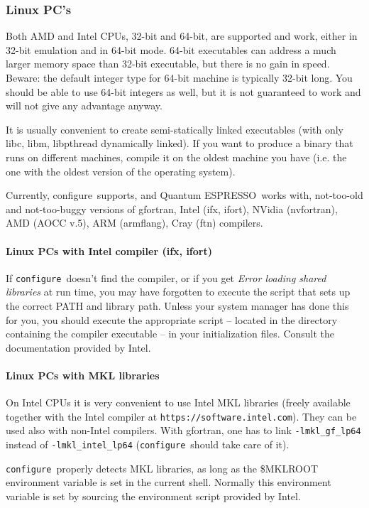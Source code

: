 \documentclass[12pt,a4paper]{article}
\def\qe{{\sc Quantum ESPRESSO}}
\def\configure{\texttt{configure}}
\begin{document}
\subsubsection{Linux PC's}

Both AMD and Intel CPUs, 32-bit and 64-bit, are supported and work,
either in 32-bit emulation and in 64-bit mode. 64-bit executables
can address a much larger memory space than 32-bit executable, but
there is no gain in speed.
Beware: the default integer type for 64-bit machine is typically
32-bit long. You should be able to use 64-bit integers as well,
but it is not guaranteed to work and will not give
any advantage anyway.

It is usually convenient to create semi-statically linked executables (with only
libc, libm, libpthread dynamically linked). If you want to produce a binary
that runs on different machines, compile it on the oldest machine you have
(i.e. the one with the oldest version of the operating system).

Currently, configure\ supports, and \qe\ works with, not-too-old and
not-too-buggy versions of gfortran, Intel (ifx, ifort), NVidia (nvfortran), 
AMD (AOCC v.5), ARM (armflang), Cray (ftn) compilers.

\paragraph{Linux PCs with Intel compiler (ifx, ifort)}
If \configure\ doesn't find the compiler, or if you get
{\em Error loading shared libraries} at run time, you may have
forgotten to execute the script that
sets up the correct PATH and library path. Unless your system manager has
done this for you, you should execute the appropriate script -- located in
the directory containing the compiler executable -- in your
initialization files. Consult the documentation provided by Intel.

\paragraph{Linux PCs with MKL libraries}
On Intel CPUs it is very convenient to use Intel MKL libraries
(freely available together with the Intel compiler at
\texttt{https://software.intel.com}). They can be used also 
with non-Intel compilers. With gfortran, one has to link 
\texttt{-lmkl\_gf\_lp64} instead of \texttt{-lmkl\_intel\_lp64} 
(\configure\ should take care of it).

\configure\ properly detects MKL libraries,
as long as the \$MKLROOT environment variable is set in the current shell.
Normally this environment variable is set by sourcing the environment script
provided by Intel.
\end{document}
